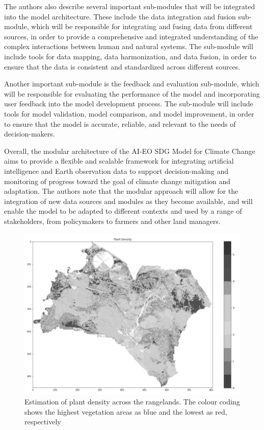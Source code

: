 \documentclass[draft, {\secondLanguage}, english]{volcanica-template}
\begin{document}
The authors also describe several important sub-modules that will be integrated into the model architecture. These include the data integration and fusion sub-module, which will be responsible for integrating and fusing data from different sources, in order to provide a comprehensive and integrated understanding of the complex interactions between human and natural systems. The sub-module will include tools for data mapping, data harmonization, and data fusion, in order to ensure that the data is consistent and standardized across different sources.

Another important sub-module is the feedback and evaluation sub-module, which will be responsible for evaluating the performance of the model and incorporating user feedback into the model development process. The sub-module will include tools for model validation, model comparison, and model improvement, in order to ensure that the model is accurate, reliable, and relevant to the needs of decision-makers.

Overall, the modular architecture of the AI-EO SDG Model for Climate Change aims to provide a flexible and scalable framework for integrating artificial intelligence and Earth observation data to support decision-making and monitoring of progress toward the goal of climate change mitigation and adaptation. The authors note that the modular approach will allow for the integration of new data sources and modules as they become available, and will enable the model to be adapted to different contexts and used by a range of stakeholders, from policymakers to farmers and other land managers.

\begin{figure}[!t]								%
\centering
\includegraphics[width=\textwidth]{Images/fig2-3.png} 
\caption{Estimation of plant density across the rangelands. The colour coding shows the highest vegetation areas as blue and the lowest as red, respectively
}	
\label{fig:02}									
\end{figure}
\end{document}
